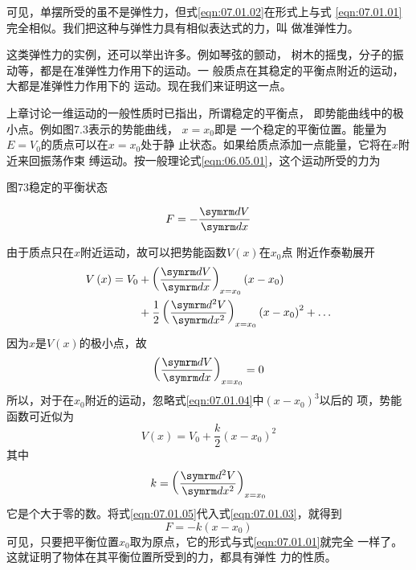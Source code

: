 可见，单摆所受的虽不是弹性力，但式\eqref{eqn:07.01.02}在形式上与式
\eqref{eqn:07.01.01}完全相似。我们把这种与弹性力具有相似表达式的力，叫
做准弹性力。

这类弹性力的实例，还可以举出许多。例如琴弦的颤动，
树木的摇曳，分子的振动等，都是在准弹性力作用下的运动。一
般质点在其稳定的平衡点附近的运动，大都是准弹性力作用下的
运动。现在我们来证明这一点。

上章讨论一维运动的一般性质时已指出，所谓稳定的平衡点，
即势能曲线中的极小点。例如图7.3表示的势能曲线， $ x = x _ { 0 }   $即是
一个稳定的平衡位置。能量为$ E = V _ 0 $的质点可以在$  x = x _ { 0 }   $处于静
止状态。如果给质点添加一点能量，它将在$ x $附近来回振荡作束
缚运动。按一般理论式\eqref{eqn:06.05.01}，这个运动所受的力为

图73稳定的平衡状态

\begin{equation}\label{eqn:07.01.03}
	F = - \frac { \dif V } { \dif x }
\end{equation}

由于质点只在$ x $附近运动，故可以把势能函数$ V\left(x\right) $在$  x _ { 0 }   $点
附近作泰勒展开
\begin{equation}\label{eqn:07.01.04}
	\begin{aligned}
	V \left( x \right) = V _ { 0 } &+ \left ( \frac { \dif V } { \dif x } \right ) _ { x = x _ { 0 } } \left( x - x _ { 0 } \right)  \\
&+ \frac { 1 } { 2 } \left( \frac { \dif ^ { 2 } V } { \dif x ^ { 2 } } \right) _ { x = x _ { 0 } } \left( x - x _ { 0 } \right) ^ { 2 } + \dots
	\end{aligned}
\end{equation}
因为$ x $是$ V\left(x\right) $的极小点，故
\begin{equation*}
	\left( \frac { \dif V } { \dif x } \right) _ { x = x _ { 0 } }  = 0
\end{equation*}
所以，对于在$ x _ { 0 } $附近的运动，忽略式\eqref{eqn:07.01.04}中$ \left( x - x _ { 0 } \right) ^ { 3 }  $以后的
项，势能函数可近似为
\begin{equation}\label{eqn:07.01.05}
	V \left( x \right) = V _ { 0 } + \frac { k } { 2 } \left( x - x _ { 0 } \right) ^ { 2 }
\end{equation}
其中
\begin{equation}\label{eqn:07.01.06}
	k = \left( \frac { \dif ^ { 2 } V } { \dif x ^ { 2 } } \right) _ { x = x _ { 0 } }
\end{equation}
它是个大于零的数。将式\eqref{eqn:07.01.05}代入式\eqref{eqn:07.01.03}，就得到
\begin{equation}\label{eqn:07.01.07}
	F = - k \left( x - x _ { 0 } \right)
\end{equation}
可见，只要把平衡位置$ x _ 0 $取为原点，它的形式与式\eqref{eqn:07.01.01}就完全
一样了。这就证明了物体在其平衡位置所受到的力，都具有弹性
力的性质。

